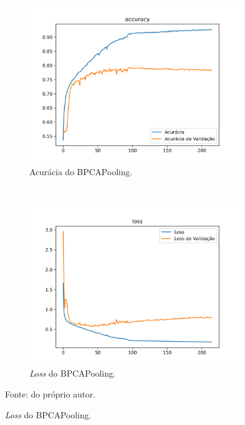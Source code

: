 \begin{figure}[H]
     \begin{subfigure}[t]{0.45\textwidth}
         \centering
         \includegraphics[width=1\linewidth]{recursos/imagens/results/bpca500_ulike_acc_accuracy.png}
         \caption{Acurácia do BPCAPooling.}
         \label{results:fig:semantic:6.3}
     \end{subfigure}
     ~
     \begin{subfigure}[t]{0.45\textwidth}
         \centering
         \includegraphics[width=1\linewidth]{recursos/imagens/results/bpca500_ulike_acc_loss.png}
         \caption{\textit{Loss} do BPCAPooling.}
         \label{results:fig:semantic:6.4}
     \end{subfigure}
     
     Fonte: do próprio autor.
\end{figure}

